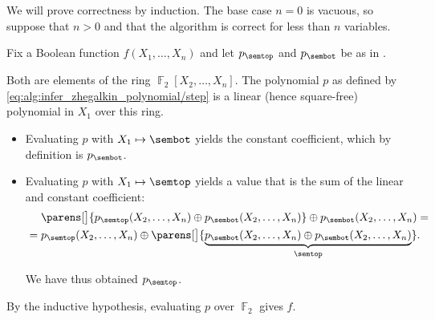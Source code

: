 \begin{defproof}
  We will prove correctness by induction. The base case \( n = 0 \) is vacuous, so suppose that \( n > 0 \) and that the algorithm is correct for less than \( n \) variables.

  Fix a Boolean function \( f(X_1, \ldots, X_n) \) and let \( p_\semtop \) and \( p_\sembot \) be as in .

  Both are elements of the ring \( \BbbF_2[X_2, \ldots, X_n] \). The polynomial \( p \) as defined by \eqref{eq:alg:infer_zhegalkin_polynomial/step} is a linear (hence square-free) polynomial in \( X_1 \) over this ring.
  \begin{itemize}
    \item Evaluating \( p \) with \( X_1 \mapsto \sembot \) yields the constant coefficient, which by definition is \( p_\sembot \).
    \item Evaluating \( p \) with \( X_1 \mapsto \semtop \) yields a value that is the sum of the linear and constant coefficient:
    \begin{align*}
      &\phantom{{}={}}
      \parens[\big]{ p_\semtop(X_2, \ldots, X_n) \oplus p_\sembot(X_2, \ldots, X_n) } \oplus p_\sembot(X_2, \ldots, X_n)
      = \\ &=
      p_\semtop(X_2, \ldots, X_n) \oplus \parens[\big]{ \underbrace{p_\sembot(X_2, \ldots, X_n) \oplus p_\sembot(X_2, \ldots, X_n)}_{\semtop} }.
    \end{align*}

    We have thus obtained \( p_\semtop \).
  \end{itemize}

  By the inductive hypothesis, evaluating \( p \) over \( \BbbF_2 \) gives \( f \).
\end{defproof}


